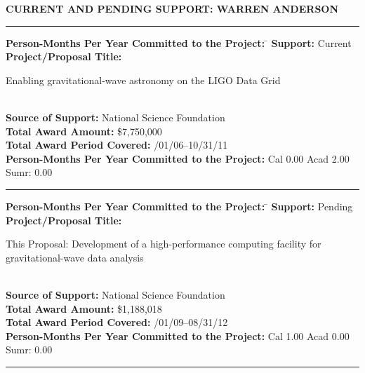 \documentclass[11pt]{NSF}
\begin{document}

\begin{center}
\large\bfseries CURRENT AND PENDING SUPPORT: WARREN ANDERSON
\end{center}
\hrule
\vskip 6pt

\begin{tabbing}
\textbf{Person-Months Per Year Committed to the Project:}   
\hspace*{0.1in}\= \kill
\textbf{Support:} \> Current\\
\textbf{Project/Proposal Title:} \> \parbox[t]{2.75in}{Enabling gravitational-wave astronomy on the LIGO Data Grid\vspace*{0.05in}} \\
\textbf{Source of Support:}\>  National Science Foundation\\
\textbf{Total Award Amount:} \> \$7,750,000\\
\textbf{Total Award Period Covered:} /01/06--10/31/11\\
\textbf{Person-Months Per Year Committed to the Project:} \> Cal 0.00 Acad 2.00 Sumr: 0.00\\
\end{tabbing}
\hrule
\vskip 3pt
\begin{tabbing}
\textbf{Person-Months Per Year Committed to the Project:}   
\hspace*{0.1in}\= \kill
\textbf{Support:} \> Pending \\
\textbf{Project/Proposal Title:} \> \parbox[t]{2.75in}{This Proposal: Development of a high-performance computing facility for gravitational-wave data analysis\vspace*{0.05in}} \\
\textbf{Source of Support:}\> National Science Foundation \\
\textbf{Total Award Amount:} \> \$1,188,018\\
\textbf{Total Award Period Covered:} /01/09--08/31/12\\
\textbf{Person-Months Per Year Committed to the Project:} \> Cal 1.00 Acad 0.00 Sumr: 0.00\\
\end{tabbing}
\hrule
\vskip 3pt
\end{document}
